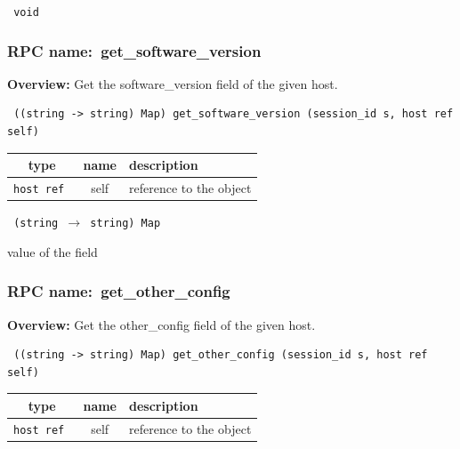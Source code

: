 {\tt 
void
}



\vspace{0.3cm}
\vspace{0.3cm}
\vspace{0.3cm}
\subsubsection{RPC name:~get\_software\_version}

{\bf Overview:} 
Get the software\_version field of the given host.

\begin{verbatim} ((string -> string) Map) get_software_version (session_id s, host ref self)\end{verbatim}



 
\vspace{0.3cm}
\begin{tabular}{|c|c|p{7cm}|}
 \hline
{\bf type} & {\bf name} & {\bf description} \\ \hline
{\tt host ref } & self & reference to the object \\ \hline 

\end{tabular}

\vspace{0.3cm}

{\tt 
(string $\rightarrow$ string) Map
}


value of the field
\vspace{0.3cm}
\vspace{0.3cm}
\vspace{0.3cm}
\subsubsection{RPC name:~get\_other\_config}

{\bf Overview:} 
Get the other\_config field of the given host.

\begin{verbatim} ((string -> string) Map) get_other_config (session_id s, host ref self)\end{verbatim}



 
\vspace{0.3cm}
\begin{tabular}{|c|c|p{7cm}|}
 \hline
{\bf type} & {\bf name} & {\bf description} \\ \hline
{\tt host ref } & self & reference to the object \\ \hline 

\end{tabular}

